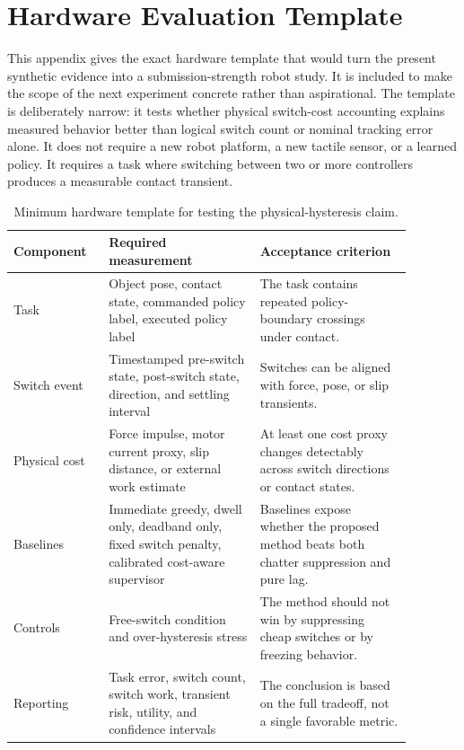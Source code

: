\documentclass{article}
\begin{document}
\section{Hardware Evaluation Template}

This appendix gives the exact hardware template that would turn the present synthetic evidence into a submission-strength robot study.
It is included to make the scope of the next experiment concrete rather than aspirational.
The template is deliberately narrow: it tests whether physical switch-cost accounting explains measured behavior better than logical switch count or nominal tracking error alone.
It does not require a new robot platform, a new tactile sensor, or a learned policy.
It requires a task where switching between two or more controllers produces a measurable contact transient.

\begin{table}[h]
\centering
\small
\caption{Minimum hardware template for testing the physical-hysteresis claim.}
\label{tab:hardware-template}
\begin{tabular}{p{0.20\linewidth}p{0.34\linewidth}p{0.34\linewidth}}
\toprule
Component & Required measurement & Acceptance criterion \\
\midrule
Task & Object pose, contact state, commanded policy label, executed policy label & The task contains repeated policy-boundary crossings under contact. \\
Switch event & Timestamped pre-switch state, post-switch state, direction, and settling interval & Switches can be aligned with force, pose, or slip transients. \\
Physical cost & Force impulse, motor current proxy, slip distance, or external work estimate & At least one cost proxy changes detectably across switch directions or contact states. \\
Baselines & Immediate greedy, dwell only, deadband only, fixed switch penalty, calibrated cost-aware supervisor & Baselines expose whether the proposed method beats both chatter suppression and pure lag. \\
Controls & Free-switch condition and over-hysteresis stress & The method should not win by suppressing cheap switches or by freezing behavior. \\
Reporting & Task error, switch count, switch work, transient risk, utility, and confidence intervals & The conclusion is based on the full tradeoff, not a single favorable metric. \\
\bottomrule
\end{tabular}
\end{table}
\end{document}

